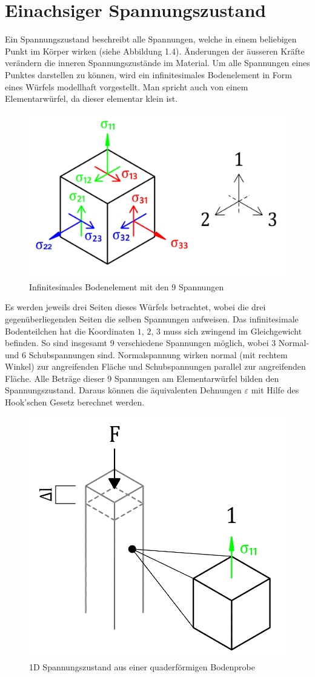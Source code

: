\section{Einachsiger Spannungszustand\label{spannung:section:Einachsiger Spannungsustand}}
Ein Spannungszustand beschreibt alle Spannungen, welche in einem beliebigen Punkt im Körper wirken (siehe Abbildung 1.4).
Änderungen der äusseren Kräfte verändern die inneren Spannungszustände im Material.
Um alle Spannungen eines Punktes darstellen zu können, wird ein infinitesimales Bodenelement in Form eines Würfels modellhaft vorgestellt.
Man spricht auch von einem Elementarwürfel, da dieser elementar klein ist.

\begin{figure}
	\centering
	\includegraphics[width=0.5\linewidth,keepaspectratio]{papers/spannung/Grafiken/Bild2.png}
	\caption{Infinitesimales Bodenelement mit den 9 Spannungen}
	\label{fig:infintesimaler-wurfel}
\end{figure}

Es werden jeweils drei Seiten dieses Würfels betrachtet, wobei die drei gegenüberliegenden Seiten die selben Spannungen aufweisen.
Das infinitesimale Bodenteilchen hat die Koordinaten $1$, $2$, $3$ muss sich zwingend im Gleichgewicht befinden.
So sind insgesamt 9 verschiedene Spannungen möglich, wobei 3 Normal- und 6 Schubspannungen sind.
Normalspannung wirken normal (mit rechtem Winkel) zur angreifenden Fläche und Schubspannungen parallel zur angreifenden Fläche.
Alle Beträge dieser 9 Spannungen am Elementarwürfel bilden den Spannungszustand.
Daraus können die äquivalenten Dehnungen $\varepsilon$ mit Hilfe des Hook'schen Gesetz berechnet werden.

\begin{figure}
	\centering
	\includegraphics[width=0.5\linewidth,keepaspectratio]{papers/spannung/Grafiken/Bild1.png}
	\caption{1D Spannungszustand aus einer quaderförmigen Bodenprobe}
	\label{fig:infintesimaler-wurfel}
\end{figure}

